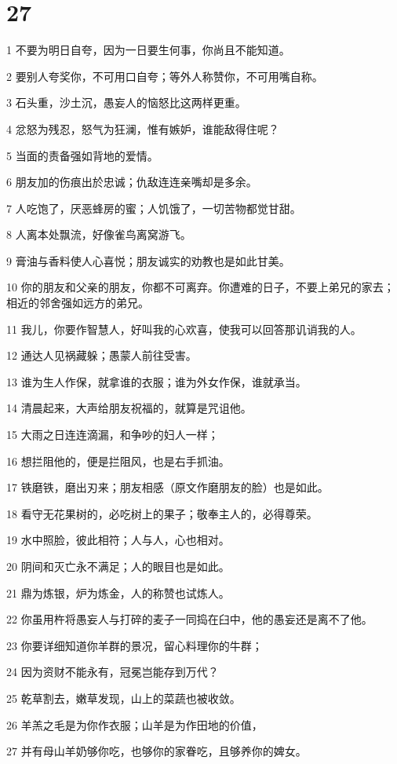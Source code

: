 \chapter{27}

\par 1 不要为明日自夸，因为一日要生何事，你尚且不能知道。
\par 2 要别人夸奖你，不可用口自夸；等外人称赞你，不可用嘴自称。
\par 3 石头重，沙土沉，愚妄人的恼怒比这两样更重。
\par 4 忿怒为残忍，怒气为狂澜，惟有嫉妒，谁能敌得住呢？
\par 5 当面的责备强如背地的爱情。
\par 6 朋友加的伤痕出於忠诚；仇敌连连亲嘴却是多余。
\par 7 人吃饱了，厌恶蜂房的蜜；人饥饿了，一切苦物都觉甘甜。
\par 8 人离本处飘流，好像雀鸟离窝游飞。
\par 9 膏油与香料使人心喜悦；朋友诚实的劝教也是如此甘美。
\par 10 你的朋友和父亲的朋友，你都不可离弃。你遭难的日子，不要上弟兄的家去；相近的邻舍强如远方的弟兄。
\par 11 我儿，你要作智慧人，好叫我的心欢喜，使我可以回答那讥诮我的人。
\par 12 通达人见祸藏躲；愚蒙人前往受害。
\par 13 谁为生人作保，就拿谁的衣服；谁为外女作保，谁就承当。
\par 14 清晨起来，大声给朋友祝福的，就算是咒诅他。
\par 15 大雨之日连连滴漏，和争吵的妇人一样；
\par 16 想拦阻他的，便是拦阻风，也是右手抓油。
\par 17 铁磨铁，磨出刃来；朋友相感（原文作磨朋友的脸）也是如此。
\par 18 看守无花果树的，必吃树上的果子；敬奉主人的，必得尊荣。
\par 19 水中照脸，彼此相符；人与人，心也相对。
\par 20 阴间和灭亡永不满足；人的眼目也是如此。
\par 21 鼎为炼银，炉为炼金，人的称赞也试炼人。
\par 22 你虽用杵将愚妄人与打碎的麦子一同捣在臼中，他的愚妄还是离不了他。
\par 23 你要详细知道你羊群的景况，留心料理你的牛群；
\par 24 因为资财不能永有，冠冕岂能存到万代？
\par 25 乾草割去，嫩草发现，山上的菜蔬也被收敛。
\par 26 羊羔之毛是为你作衣服；山羊是为作田地的价值，
\par 27 并有母山羊奶够你吃，也够你的家眷吃，且够养你的婢女。

